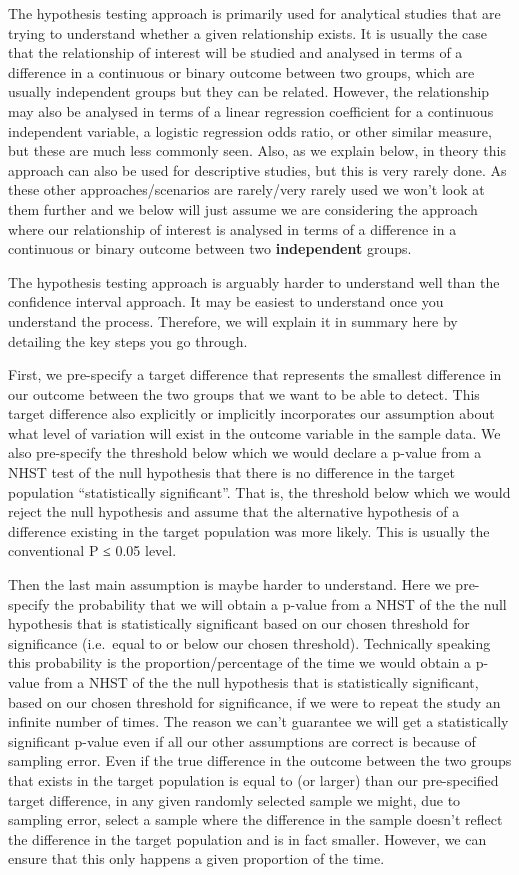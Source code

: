 \documentclass[
]{book}
\begin{document}
The hypothesis testing approach is primarily used for analytical studies that are trying to understand whether a given relationship exists. It is usually the case that the relationship of interest will be studied and analysed in terms of a difference in a continuous or binary outcome between two groups, which are usually independent groups but they can be related. However, the relationship may also be analysed in terms of a linear regression coefficient for a continuous independent variable, a logistic regression odds ratio, or other similar measure, but these are much less commonly seen. Also, as we explain below, in theory this approach can also be used for descriptive studies, but this is very rarely done. As these other approaches/scenarios are rarely/very rarely used we won't look at them further and we below will just assume we are considering the approach where our relationship of interest is analysed in terms of a difference in a continuous or binary outcome between two \textbf{independent} groups.

The hypothesis testing approach is arguably harder to understand well than the confidence interval approach. It may be easiest to understand once you understand the process. Therefore, we will explain it in summary here by detailing the key steps you go through.

First, we pre-specify a target difference that represents the smallest difference in our outcome between the two groups that we want to be able to detect. This target difference also explicitly or implicitly incorporates our assumption about what level of variation will exist in the outcome variable in the sample data. We also pre-specify the threshold below which we would declare a p-value from a NHST test of the null hypothesis that there is no difference in the target population ``statistically significant''. That is, the threshold below which we would reject the null hypothesis and assume that the alternative hypothesis of a difference existing in the target population was more likely. This is usually the conventional P ≤ 0.05 level.

Then the last main assumption is maybe harder to understand. Here we pre-specify the probability that we will obtain a p-value from a NHST of the the null hypothesis that is statistically significant based on our chosen threshold for significance (i.e.~equal to or below our chosen threshold). Technically speaking this probability is the proportion/percentage of the time we would obtain a p-value from a NHST of the the null hypothesis that is statistically significant, based on our chosen threshold for significance, if we were to repeat the study an infinite number of times. The reason we can't guarantee we will get a statistically significant p-value even if all our other assumptions are correct is because of sampling error. Even if the true difference in the outcome between the two groups that exists in the target population is equal to (or larger) than our pre-specified target difference, in any given randomly selected sample we might, due to sampling error, select a sample where the difference in the sample doesn't reflect the difference in the target population and is in fact smaller. However, we can ensure that this only happens a given proportion of the time.
\end{document}

